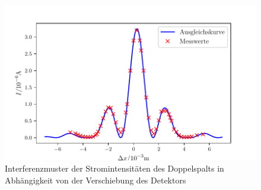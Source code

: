 \begin{figure}
\centering
\includegraphics[width=\linewidth-70pt,height=\textheight-70pt,keepaspectratio]{Doppelspalt1.pdf}
\caption{Interferenzmuster der Stromintensitäten des Doppelspalts in Abhängigkeit von der Verschiebung des Detektors}
\label{fig:Doppel}
\end{figure}

